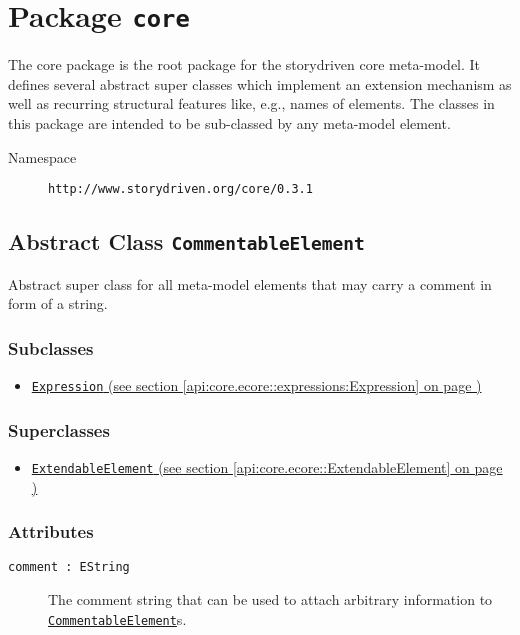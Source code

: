 \section{Package \texttt{core}}
\label{api:core.ecore:}
The core package is the root package for the storydriven core meta-model. It defines several abstract super classes which implement an extension mechanism as well as recurring structural features like, e.g., names of elements. The classes in this package are intended to be sub-classed by any meta-model element.
\begin{description}
\item[Namespace] \texttt{http://www.storydriven.org/core/0.3.1}
\end{description}
\subsection{Abstract Class \texttt{CommentableElement}}
\label{api:core.ecore::CommentableElement}
Abstract super class for all meta-model elements that may carry a comment in form of a string.
\subsubsection*{Subclasses}
\begin{itemize}
\item \hyperref[api:core.ecore::expressions:Expression]{\texttt{Expression} (see section \ref*{api:core.ecore::expressions:Expression} on page \pageref*{api:core.ecore::expressions:Expression})}
\end{itemize}
\subsubsection*{Superclasses}
\begin{itemize}
\item \hyperref[api:core.ecore::ExtendableElement]{\texttt{ExtendableElement} (see section \ref*{api:core.ecore::ExtendableElement} on page \pageref*{api:core.ecore::ExtendableElement})}
\end{itemize}
\subsubsection*{Attributes}
\begin{description}
\item[\texttt{comment~:~EString}] The comment string that can be used to attach arbitrary information to \hyperref[CommentableElement]{\texttt{CommentableElement}}s.
\end{description}
